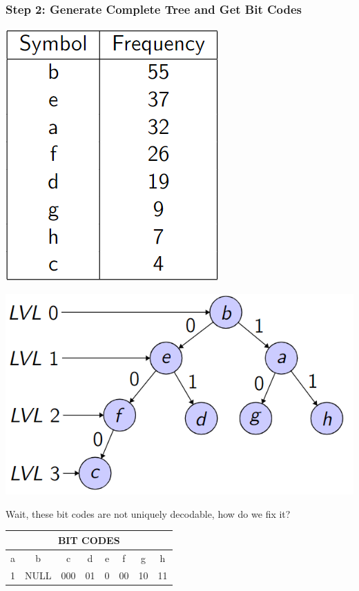 \documentclass{beamer}
\begin{document}
\begin{frame}
    \frametitle{Step 2: Generate Complete Tree and Get Bit Codes}

    \begin{center}
        \begin{minipage}{0.2\textwidth}
          \centering
          \includegraphics[scale=0.35]{images/freqtbl.png}
        \end{minipage}
        \hfill
        \begin{minipage}{0.6\textwidth}
          \centering
          \includegraphics[scale=.35]{images/bintree.png}
        \end{minipage}
    \end{center}
    Wait, these bit codes are not uniquely decodable, how do we fix it?
    \begin{center}
        \begin{tabular}{|c|c|c|c|c|c|c|c|}
            \hline
            \multicolumn{8}{|c|}{BIT CODES} \\
            \hline
            a & b & c & d & e & f & g & h \\
            \hline
            1  & NULL  & 000  & 01  & 0  & 00  & 10  & 11\\
            \hline
        \end{tabular}
    \end{center}
\end{frame}
\end{document}
